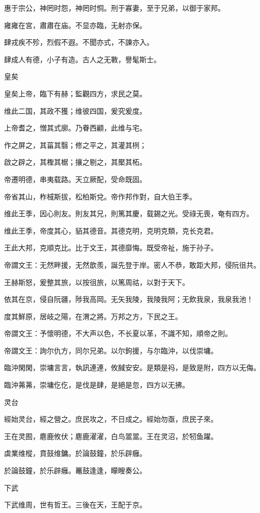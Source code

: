 惠于宗公，神罔时怨，神罔时恫。刑于寡妻，至于兄弟，以御于家邦。

雍雍在宮，肅肅在庙。不显亦臨，无射亦保。

肆戎疾不殄，烈假不遐。不聞亦式，不諫亦入。

肆成人有德，小子有造。古人之无斁，譽髦斯士。

皇矣

皇矣上帝，臨下有赫；監觀四方，求民之莫。

维此二国，其政不獲；维彼四国，爰究爰度。

上帝耆之，憎其式廓。乃眷西顧，此维与宅。

作之屏之，其菑其翳；修之平之，其灌其栵；

啟之辟之，其檉其椐；攘之剔之，其檿其柘。

帝遷明德，串夷载路。天立厥配，受命既固。

帝省其山，柞棫斯拔，松柏斯兌。帝作邦作對，自大伯王季。

维此王季，因心則友。則友其兄，則篤其慶，载錫之光。受祿无喪，奄有四方。

维此王季，帝度其心，貊其德音。其德克明，克明克類，克长克君。

王此大邦，克順克比。比于文王，其德靡悔。既受帝祉，施于孙子。

帝謂文王：无然畔援，无然歆羨，誕先登于岸。密人不恭，敢距大邦，侵阮徂共。

王赫斯怒，爰整其旅，以按徂旅，以篤周祜，以對于天下。

依其在京，侵自阮疆，陟我高岡。无矢我陵，我陵我阿；无飲我泉，我泉我池！

度其鮮原，居岐之陽，在渭之將。万邦之方，下民之王。

帝謂文王：予懷明德，不大声以色，不长夏以革，不識不知，順帝之則。

帝謂文王：詢尔仇方，同尔兄弟。以尔鉤援，与尔臨沖，以伐崇墉。

臨沖閑閑，崇墉言言，執訊連連，攸馘安安。是類是祃，是致是附，四方以无侮。

臨沖茀茀，崇墉仡仡，是伐是肆，是絕是忽，四方以无拂。

灵台

經始灵台，經之營之。庶民攻之，不日成之。經始勿亟，庶民子來。

王在灵囿，麀鹿攸伏；麀鹿濯濯，白鸟翯翯。王在灵沼，於牣鱼躍。

虡業维樅，賁鼓维鏞。於論鼓鐘，於乐辟癰。

於論鼓鐘，於乐辟癰。鼉鼓逢逢，矇瞍奏公。

下武

下武维周，世有哲王。三後在天，王配于京。

